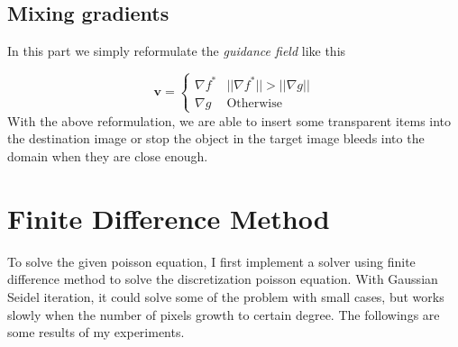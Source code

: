 \documentclass[11pt]{article}
\begin{document}
	
\subsection{Mixing gradients}
	In this part we simply reformulate the \textit{guidance field} like this
	
	\begin{equation}
		\boldsymbol{v} = 
		\begin{cases}
			\nabla f^* & ||\nabla f^*|| > ||\nabla g|| \\
			\nabla g & \text{Otherwise}
		\end{cases}
	\end{equation} 
	With the above reformulation, we are able to insert some transparent items into the destination image or stop the object in the target image bleeds into the domain when they are close enough.
	
\section{Finite Difference Method}
	
	To solve the given poisson equation, I first implement a solver using finite difference method to solve the discretization poisson equation. With Gaussian Seidel iteration, it could solve some of the problem with small cases, but works slowly when the number of pixels growth to certain degree. The followings are some results of my experiments.
\end{document}
